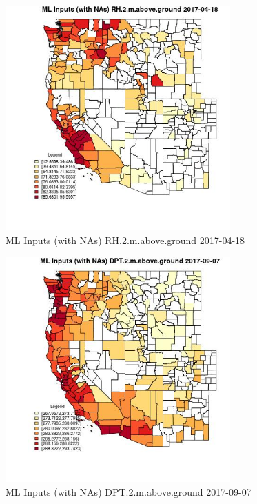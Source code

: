 \begin{figure} 
\centering  
\includegraphics[width=0.77\textwidth]{Code_Outputs/Report_ML_input_PM25_Step4_part_e_de_duplicated_aves_compiled_2019-05-21wNAs_CountyRH2mabovegroundMean2017-04-18.jpg} 
\caption{\label{fig:Report_ML_input_PM25_Step4_part_e_de_duplicated_aves_compiled_2019-05-21wNAsCountyRH2mabovegroundMean2017-04-18}ML Inputs (with NAs) RH.2.m.above.ground 2017-04-18} 
\end{figure} 
 

\begin{figure} 
\centering  
\includegraphics[width=0.77\textwidth]{Code_Outputs/Report_ML_input_PM25_Step4_part_e_de_duplicated_aves_compiled_2019-05-21wNAs_CountyDPT2mabovegroundMean2017-09-07.jpg} 
\caption{\label{fig:Report_ML_input_PM25_Step4_part_e_de_duplicated_aves_compiled_2019-05-21wNAsCountyDPT2mabovegroundMean2017-09-07}ML Inputs (with NAs) DPT.2.m.above.ground 2017-09-07} 
\end{figure} 
 

